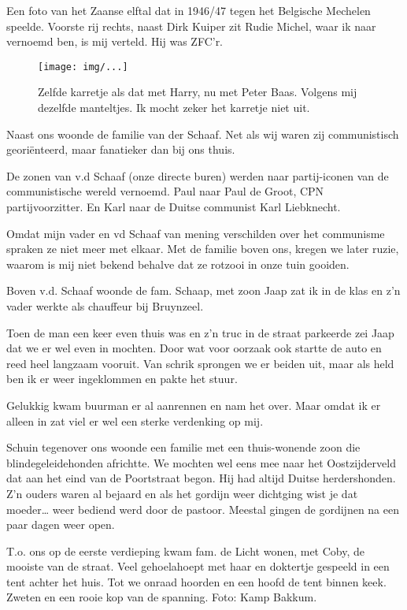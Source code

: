 \documentclass[10pt,twoside,openright]{memoir}
\begin{document}
Een foto van het Zaanse elftal dat in 1946/47 tegen het Belgische Mechelen speelde. Voorste rij rechts, naast Dirk Kuiper zit Rudie Michel, waar ik naar vernoemd ben, is mij verteld. Hij was ZFC’r. 

\begin{figure}[t]
\texttt{[image: img/...]}
\caption{Zelfde karretje als dat met Harry, nu met Peter Baas. Volgens mij dezelfde manteltjes. Ik mocht zeker het karretje niet uit.}
\end{figure}

Naast ons woonde de familie van der Schaaf. Net als wij waren zij communistisch georiënteerd, maar fanatieker dan bij ons thuis. 

De zonen van v.d Schaaf (onze directe buren) werden naar partij-iconen van de communistische wereld vernoemd. Paul naar Paul de Groot, CPN partijvoorzitter. En Karl naar de Duitse communist Karl Liebknecht. 

Omdat mijn vader en vd Schaaf van mening verschilden over het communisme spraken ze niet meer met elkaar. Met de familie boven ons, kregen we later ruzie, waarom is mij niet bekend behalve dat ze rotzooi in onze tuin gooiden. 

Boven v.d. Schaaf woonde de fam. Schaap, met zoon Jaap zat ik in de klas en z’n vader werkte als chauffeur bij Bruynzeel. 

Toen de man een keer even thuis was en z'n truc in de straat parkeerde zei Jaap dat we er wel even in mochten. Door wat voor oorzaak ook startte de auto en reed heel langzaam vooruit. Van schrik sprongen we er beiden uit, maar als held ben ik er weer ingeklommen en pakte het stuur. 

Gelukkig kwam buurman er al aanrennen en nam het over. Maar omdat ik er alleen in zat viel er wel een sterke verdenking op mij. 

Schuin tegenover ons woonde een familie met een thuis-wonende zoon die blindegeleidehonden africhtte. We mochten wel eens mee naar het Oostzijderveld dat aan het eind van de Poortstraat begon. Hij had altijd Duitse herdershonden. Z'n ouders waren al bejaard en als het gordijn weer dichtging wist je dat moeder… weer bediend werd door de pastoor. Meestal gingen de gordijnen na een paar dagen weer open. 

T.o. ons op de eerste verdieping kwam fam. de Licht wonen, met Coby, de mooiste van de straat. Veel gehoelahoept met haar en doktertje gespeeld in een tent achter het huis. Tot we onraad hoorden en een hoofd de tent binnen keek. Zweten en een rooie kop van de spanning. Foto: Kamp Bakkum. 
\end{document}
